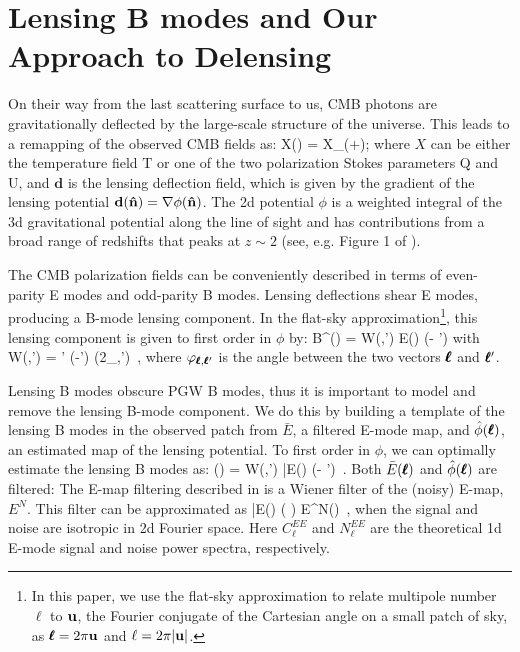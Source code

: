 \section{Lensing B modes and Our Approach to Delensing}
\label{sec:theory}
On their way from the last scattering surface to us, CMB photons are gravitationally deflected by the large-scale structure of the universe.
This leads to a remapping of the observed CMB fields as:
\beq
X() = X_{}(+);
\eeq
where $X$ can be either the temperature field T or one of the two polarization Stokes parameters Q and U, and $\mathbf{d}$ is the lensing deflection field, which is given by the gradient of the lensing potential $\mathbf{d}(\mathbf{\hat{n}}) = \nabla \phi(\mathbf{\hat{n}})$.
The 2d potential $\phi$ is a weighted integral of the 3d gravitational potential along the line of sight and has contributions from a broad range of redshifts that peaks at $z\sim 2$ (see, e.g. Figure 1 of \citealt{planck2013XVIII}).


The CMB polarization fields can be conveniently described in terms of even-parity E modes and odd-parity B modes.
Lensing deflections shear E modes, producing a B-mode lensing component.
In the flat-sky approximation\footnote{
In this paper, we use the flat-sky approximation to relate multipole number $\ell$ to $\mathbf{u}$, the Fourier conjugate of the Cartesian angle on a small patch of sky, as $\pmb{\ell} = 2\pi\mathbf{u}$ and $\ell =2\pi|\mathbf{u}|$.},
this lensing component is given to first order in $\phi$ by:
\beq\label{eqn:blens}
B^{}(\bl) =  \int {} W(\bl,\bl') E(\ublu) \phi(\bl - \bl')
\eeq
with
\beq
W(\bl,\bl') = \bl' \cdot (\bl-\bl') \sin(2\varphi_{\bl,\bl'}) \,,
\eeq
where $\varphi_{\pmb{\ell},\pmb{\ell}'}$ is the angle between the two vectors $\pmb{\ell}$ and $\pmb{\ell}'$.

Lensing B modes obscure PGW B modes, thus it is important to model and remove the lensing B-mode component.
We do this by building a template of the lensing B modes in the observed patch from $\bar{E}$, a filtered E-mode map,
and $\hat{\phi}(\pmb{\ell})$, an estimated map of the lensing potential.
To first order in $\phi$, we can optimally estimate the lensing B modes as:
\beq \label{eqn:blens_estimate}
\bhat(\bl) = \int {} W(\bl,\bl') \bar{E}(\ublu) \hat{\phi}(\bl - \bl') \,.
\eeq
Both $\bar{E}(\pmb{\ell})$ and $\hat{\phi}(\pmb{\ell})$ are filtered:
The E-map filtering described in  is a Wiener filter of the (noisy) E-map, $E^N$.
This filter can be approximated as
\beq \label{eqn:fle}
\bar{E}(\bl) \approx \left( \right) E^N(\bl) \,,
\eeq
when the signal and noise are isotropic in 2d Fourier space.
Here $C^{EE}_{\ell}$ and $N^{EE}_{\ell}$ are the theoretical 1d E-mode signal and noise power spectra, respectively.


